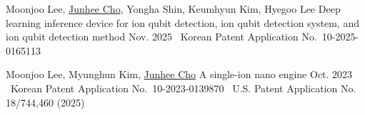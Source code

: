 

\begin{cventries}

    \cventry
    {Moonjoo Lee, \underline{Junhee Cho}, Yongha Shin, Keumhyun Kim, Hyegoo Lee}
    {Deep learning inference device for ion qubit detection, ion qubit detection system, and ion qubit detection method}
    {}
    {Nov. 2025}
    {
      \textbullet\ Korean Patent Application No.\ 10-2025-0165113
    }

    \cventry
    {Moonjoo Lee, Myunghun Kim, \underline{Junhee Cho}}
    {A single-ion nano engine}
    {}
    {Oct. 2023}
    {
      \textbullet\ Korean Patent Application No.\ 10-2023-0139870\newline
      \textbullet\ U.S. Patent Application No. 18/744,460 (2025)
    }
\end{cventries}
